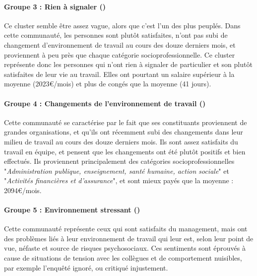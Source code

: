 \documentclass[11pt,fleqn,a4paper,openany,frenchb]{book} %
\begin{document}
\paragraph{Groupe 3 : Rien à signaler (\RAS)\\}
Ce cluster semble être assez vague, alors que c'est l'un des plus peuplés. Dans cette communauté, les personnes sont plutôt satisfaites, n'ont pas subi de changement d'environnement de travail au cours des douze derniers mois, et proviennent à peu près que chaque catégorie socioprofessionnelle. Ce cluster représente donc les personnes qui n'ont rien à signaler de particulier et son plutôt satisfaites de leur vie au travail. Elles ont pourtant un salaire supérieur à la moyenne (2023\euro{}/mois) et plus de congés que la moyenne (41 jours).

\paragraph{Groupe 4 : Changements   de   l'environnement   de
travail (\GLOB)\\}
Cette communauté se caractérise par le fait que ses constituants proviennent de grandes organisations, et qu'ils ont récemment subi des changements dans leur milieu de travail au cours des douze derniers mois. Ils sont assez satisfaits du travail en équipe, et pensent que les changements ont été plutôt positifs et bien effectués. Ils proviennent principalement des catégories socioprofessionnelles "\textit{Administration publique, enseignement, santé humaine, action sociale}" et "\textit{Activités financières et d'assurance}", et sont mieux payés que la moyenne : 2094\euro{}/mois.

\paragraph{Groupe 5 : Environnement stressant (\ENV)\\}
Cette communauté représente ceux qui sont satisfaits du management, mais ont des problèmes liés à leur environnement de travail qui leur est, selon leur point de vue, néfaste et source de risques psychosociaux. Ces sentiments sont éprouvés à cause de situations de tension avec les collègues et de comportement nuisibles, par exemple l'enquêté ignoré, ou critiqué injustement.
\end{document}
